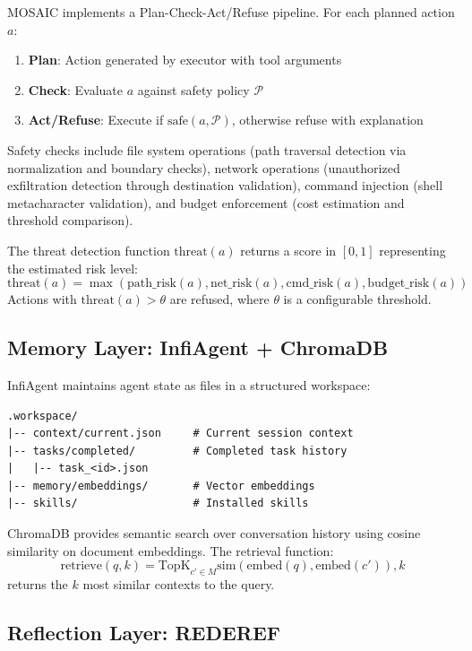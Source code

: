 \documentclass{article}
\begin{document}
MOSAIC implements a Plan-Check-Act/Refuse pipeline. For each planned action $a$:
\begin{enumerate}
    \item \textbf{Plan}: Action generated by executor with tool arguments
    \item \textbf{Check}: Evaluate $a$ against safety policy $\mathcal{P}$
    \item \textbf{Act/Refuse}: Execute if $\text{safe}(a, \mathcal{P})$, otherwise refuse with explanation
\end{enumerate}

Safety checks include file system operations (path traversal detection via normalization and boundary checks), network operations (unauthorized exfiltration detection through destination validation), command injection (shell metacharacter validation), and budget enforcement (cost estimation and threshold comparison).

The threat detection function $\text{threat}(a)$ returns a score in $[0, 1]$ representing the estimated risk level:
\begin{equation}
\text{threat}(a) = \max(\text{path\_risk}(a), \text{net\_risk}(a), \text{cmd\_risk}(a), \text{budget\_risk}(a))
\end{equation}
Actions with $\text{threat}(a) > \theta$ are refused, where $\theta$ is a configurable threshold.

\subsection{Memory Layer: InfiAgent + ChromaDB}

InfiAgent maintains agent state as files in a structured workspace:
\begin{verbatim}
.workspace/
|-- context/current.json     # Current session context
|-- tasks/completed/         # Completed task history
|   |-- task_<id>.json
|-- memory/embeddings/       # Vector embeddings
|-- skills/                  # Installed skills
\end{verbatim}

ChromaDB provides semantic search over conversation history using cosine similarity on document embeddings. The retrieval function:
\begin{equation}
\text{retrieve}(q, k) = \text{TopK}_{c' \in M} \text{sim}(\text{embed}(q), \text{embed}(c')), k
\end{equation}
returns the $k$ most similar contexts to the query.

\subsection{Reflection Layer: REDEREF}
\end{document}
